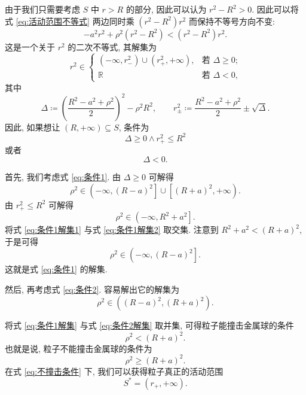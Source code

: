 \documentclass{article}
\begin{document}
由于我们只需要考虑 $S$ 中 $r>R$ 的部分, 因此可以认为 $r^2-R^2>0$.
因此可以将式 \ref{eq:活动范围不等式} 两边同时乘 $\left(r^2-R^2\right)r^2$ 而保持不等号方向不变:
\begin{equation}
	-a^2r^2+\rho^2\left(r^2-R^2\right)<\left(r^2-R^2\right)r^2.
\end{equation}
这是一个关于 $r^2$ 的二次不等式, 其解集为
\begin{equation}
	r^2\in
	\begin{cases}\left(-\infty,r_-^2\right)\cup\left(r_+^2,+\infty\right),
	&\text{若 $\Delta\ge0$;}\\
	\mathbb R&\text{若 $\Delta<0$,}\end{cases}
\end{equation}
其中
\begin{equation}
	\label{eq:Delta,r_pm}
	\Delta\coloneqq \left(\frac{R^2-a^2+\rho^2}2\right)^2-\rho^2R^2,
	\qquad r_\pm^2\coloneqq \frac{R^2-a^2+\rho^2}2\pm\sqrt\Delta.
\end{equation}
因此, 如果想让 $\left(R,+\infty\right)\subseteq S$, 条件为
\begin{equation}
	\label{eq:条件1}
	\Delta\ge0\land r_+^2\le R^2
\end{equation}
或者
\begin{equation}
	\label{eq:条件2}
	\Delta<0.
\end{equation}

首先, 我们考虑式 \ref{eq:条件1}.
由 $\Delta\ge0$ 可解得
\begin{equation}
	\label{eq:条件1解集1}
	\rho^2\in\left(-\infty,\left(R-a\right)^2\right]
	\cup\left[\left(R+a\right)^2,+\infty\right).
\end{equation}
由 $r_+^2\le R^2$ 可解得
\begin{equation}
	\label{eq:条件1解集2}
	\rho^2\in\left(-\infty,R^2+a^2\right].
\end{equation}
将式 \ref{eq:条件1解集1} 与式 \ref{eq:条件1解集2} 取交集.
注意到 $R^2+a^2<\left(R+a\right)^2$, 于是可得
\begin{equation}
	\label{eq:条件1解集}
	\rho^2\in\left(-\infty,\left(R-a\right)^2\right].
\end{equation}
这就是式 \ref{eq:条件1} 的解集.

然后, 再考虑式 \ref{eq:条件2}.
容易解出它的解集为
\begin{equation}
	\label{eq:条件2解集}
	\rho^2\in\left(\left(R-a\right)^2,\left(R+a\right)^2\right).
\end{equation}

将式 \ref{eq:条件1解集} 与式 \ref{eq:条件2解集} 取并集, 可得粒子能撞击金属球的条件
\begin{equation}
	\rho^2<\left(R+a\right)^2.
\end{equation}
也就是说, 粒子不能撞击金属球的条件为
\begin{equation}
	\label{eq:不撞击条件}
	\rho^2\ge\left(R+a\right)^2.
\end{equation}
在式 \ref{eq:不撞击条件} 下, 我们可以获得粒子真正的活动范围
\begin{equation}
	\label{eq:真正的活动范围}
	S^*=\left(r_+,+\infty\right).
\end{equation}
\end{document}
